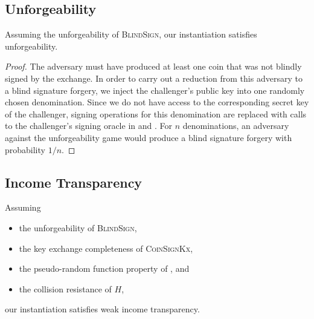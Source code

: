 \subsection{Unforgeability}

\begin{theorem}
Assuming the unforgeability of \textsc{BlindSign}, our instantiation satisfies {unforgeability}.
\end{theorem}

\begin{proof}
The adversary must have produced at least one coin that was not blindly
signed by the exchange.
In order to carry out a reduction from this adversary to a blind signature
forgery, we inject the challenger's public key into one randomly chosen
denomination.  Since we do not have access to the corresponding secret key
of the challenger, signing operations for this denomination are replaced
with calls to the challenger's signing oracle in  and
.  For $n$ denominations, an adversary against the
unforgeability game would produce a blind signature forgery with probability $1/n$.
\end{proof}


\subsection{Income Transparency}
\begin{theorem}
  Assuming
  \begin{itemize}
    \item the unforgeability of \textsc{BlindSign},
    \item the key exchange completeness of \textsc{CoinSignKx},
    \item the pseudo-random function property of , and
    \item the collision resistance of $H$,
  \end{itemize}
  our instantiation satisfies {weak income transparency}.
\end{theorem}

